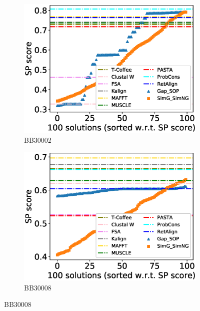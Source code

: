 \begin{figure}[!htbp]
	
	\begin{adjustwidth}{-1cm}{-1cm}
		\centering
		\begin{subfigure}{0.22\textwidth}
			\includegraphics[width=\columnwidth]{Figure/summary/precomputedInit/Balibase/BB30002_pairs_density_single_run_2}
			\caption{BB30002}
		\end{subfigure}	
		\begin{subfigure}{0.22\textwidth}
			\includegraphics[width=\columnwidth]{Figure/summary/precomputedInit/Balibase/BB30008_pairs_density_single_run_2}
			\caption{BB30008}
		\end{subfigure}

\end{adjustwidth}
\end{figure}
